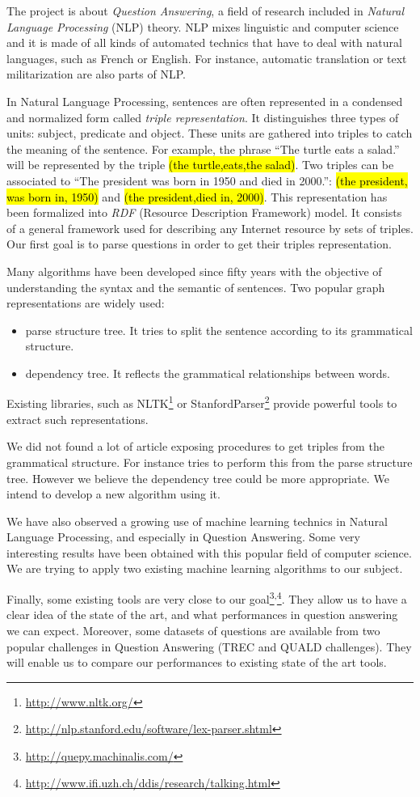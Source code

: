 The project is about \textit{Question Answering}, a field of research included in \textit{Natural Language Processing} (NLP) theory. NLP mixes linguistic and computer science and it is made of all kinds of automated technics that have to deal with natural languages, such as French or English. For instance, automatic translation or text militarization are also parts of NLP.

In Natural Language Processing, sentences are often represented in a condensed and normalized form called \textit{triple representation}. It distinguishes three types of units: subject, predicate and object. These units are gathered into triples to catch the meaning of the sentence. For example, the phrase ``The turtle eats a salad.'' will be represented by the triple \hl{(the turtle,eats,the salad)}. Two triples can be associated to ``The president was born in 1950 and died in 2000.'': \hl{(the president, was born in, 1950)} and \hl{(the president,died in, 2000)}. This representation has been formalized into \textit{RDF} (Resource Description Framework) model. It consists of a general framework used for describing any Internet resource by sets of triples. Our first goal is to parse questions in order to get their triples representation.

Many algorithms have been developed since fifty years with the objective of understanding the syntax and the semantic of sentences. Two popular graph representations are widely used:
\begin{itemize}
 \item parse structure tree. It tries to split the sentence according to its grammatical structure.
 \item dependency tree. It reflects the grammatical relationships between words.
\end{itemize}
Existing libraries, such as NLTK\footnote{\url{http://www.nltk.org/}} or StanfordParser\footnote{\url{http://nlp.stanford.edu/software/lex-parser.shtml}} provide powerful tools to extract such representations.

We did not found a lot of article exposing procedures to get triples from the grammatical structure. For instance \cite{tripleparsetree} tries to perform this from the parse structure tree. However we believe the dependency tree could be more appropriate. We intend to develop a new algorithm using it.

We have also observed a growing use of machine learning technics in Natural Language Processing, and especially in Question Answering. Some very interesting results have been obtained with this popular field of computer science. We are trying to apply two existing machine learning algorithms to our subject.

Finally, some existing tools are very close to our goal\footnote{\url{http://quepy.machinalis.com/}}\textsuperscript{,}\footnote{\url{http://www.ifi.uzh.ch/ddis/research/talking.html}}. They allow us to have a clear idea of the state of the art, and what performances in question answering we can expect. Moreover,  some datasets of questions are available from two popular challenges in Question Answering (TREC and QUALD challenges). They will enable us to compare our performances to existing state of the art tools.
